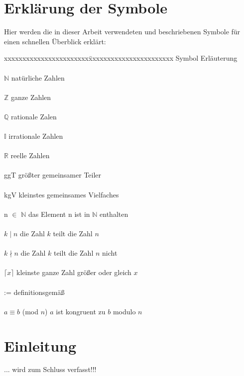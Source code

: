 \documentclass[german,12pt,a4paper]{article}
\begin{document}
\section*{Erklärung der Symbole}
Hier werden die in dieser Arbeit verwendeten und beschriebenen Symbole für einen schnellen Überblick erklärt:\\
\begin{tabbing}
xxxxxxxxxxxxxxxxxxxxxxx\=xxxxxxxxxxxxxxxxxxxxxxx\kill
\large Symbol           \> \large Erläuterung\\
\\$\mathbb{N}$          \> natürliche Zahlen\\
\\$\mathbb{Z}$          \> ganze Zahlen\\
\\$\mathbb{Q}$          \> rationale Zalen\\
\\$\mathbb{I}$          \> irrationale Zahlen\\
\\$\mathbb{R}$          \> reelle Zahlen\\
\\ggT                   \> größter gemeinsamer Teiler\\
\\kgV                   \> kleinstes gemeinsames Vielfaches\\
\\n $\in$ $\mathbb{N}$  \> das Element n ist in $\mathbb{N}$ enthalten\\
\\$k \mid n$            \> die Zahl $k$ teilt die Zahl $n$\\
\\$k \nmid n$           \> die Zahl $k$ teilt die Zahl $n$ nicht\\
\\$\lceil{x}\rceil$     \> kleinste ganze Zahl größer oder gleich $x$\\
\\:=                    \> definitionsgemäß\\
\\$a\equiv b$ (mod $n$) \> $a$ ist kongruent zu $b$ modulo $n$

\end{tabbing}
\newpage

\section*{Einleitung}
... wird zum Schluss verfasst!!!\newpage
\end{document}
